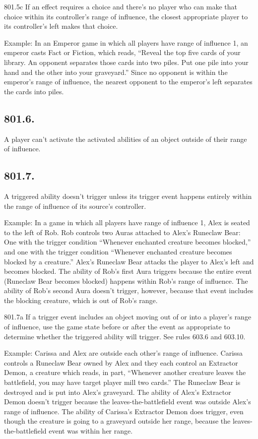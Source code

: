 801.5c If an effect requires a choice and there’s no player who can make that choice within its controller’s range of influence, the closest appropriate player to its controller’s left makes that choice.

Example: In an Emperor game in which all players have range of influence 1, an emperor casts Fact or Fiction, which reads, “Reveal the top five cards of your library. An opponent separates those cards into two piles. Put one pile into your hand and the other into your graveyard.” Since no opponent is within the emperor’s range of influence, the nearest opponent to the emperor’s left separates the cards into piles.

\subsection*{801.6.}
A player can’t activate the activated abilities of an object outside of their range of influence.

\subsection*{801.7.}
A triggered ability doesn’t trigger unless its trigger event happens entirely within the range of influence of its source’s controller.

Example: In a game in which all players have range of influence 1, Alex is seated to the left of Rob. Rob controls two Auras attached to Alex’s Runeclaw Bear: One with the trigger condition “Whenever enchanted creature becomes blocked,” and one with the trigger condition “Whenever enchanted creature becomes blocked by a creature.” Alex’s Runeclaw Bear attacks the player to Alex’s left and becomes blocked. The ability of Rob’s first Aura triggers because the entire event (Runeclaw Bear becomes blocked) happens within Rob’s range of influence. The ability of Rob’s second Aura doesn’t trigger, however, because that event includes the blocking creature, which is out of Rob’s range.

801.7a If a trigger event includes an object moving out of or into a player’s range of influence, use the game state before or after the event as appropriate to determine whether the triggered ability will trigger. See rules 603.6 and 603.10.

Example: Carissa and Alex are outside each other’s range of influence. Carissa controls a Runeclaw Bear owned by Alex and they each control an Extractor Demon, a creature which reads, in part, “Whenever another creature leaves the battlefield, you may have target player mill two cards.” The Runeclaw Bear is destroyed and is put into Alex’s graveyard. The ability of Alex’s Extractor Demon doesn’t trigger because the leaves-the-battlefield event was outside Alex’s range of influence. The ability of Carissa’s Extractor Demon does trigger, even though the creature is going to a graveyard outside her range, because the leaves-the-battlefield event was within her range.

